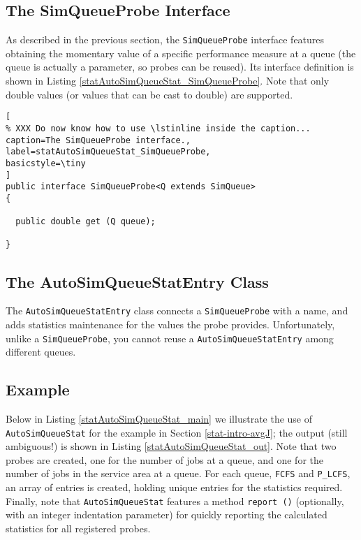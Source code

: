 \documentclass[12pt]{book}
\begin{document}
\subsection{The SimQueueProbe Interface}
\label{stat-autosimqueuestat-simqueueprobe}

As described in the previous section,
  the \lstinline-SimQueueProbe- interface
  features obtaining the momentary value of a specific performance measure
  at a queue (the queue is actually a parameter, so probes can be reused).
Its interface definition is shown in Listing \ref{statAutoSimQueueStat_SimQueueProbe}.
Note that only double values (or values that can be cast to double)
  are supported.

\begin{lstlisting}[
% XXX Do now know how to use \lstinline inside the caption...
caption=The SimQueueProbe interface.,
label=statAutoSimQueueStat_SimQueueProbe,
basicstyle=\tiny
]
public interface SimQueueProbe<Q extends SimQueue>
{
  
  public double get (Q queue);
  
}
\end{lstlisting}

\subsection{The AutoSimQueueStatEntry Class}
\label{stat-autosimqueuestat-autosimqueuestatentry}

The \lstinline|AutoSimQueueStatEntry| class connects a \lstinline|SimQueueProbe| with a name,
  and adds statistics maintenance for the values the probe provides.
Unfortunately, unlike a \lstinline|SimQueueProbe|,
  you cannot reuse a \lstinline|AutoSimQueueStatEntry| among different queues.

\subsection{Example}

Below in Listing \ref{statAutoSimQueueStat_main}
  we illustrate the use of \lstinline|AutoSimQueueStat|
  for the example in Section \ref{stat-intro-avgJ};
  the output (still ambiguous!) is shown in Listing \ref{statAutoSimQueueStat_out}.
Note that two probes are created, one for the number of jobs at a queue,
  and one for the number of jobs in the service area at a queue.
For each queue, \lstinline|FCFS| and \lstinline|P_LCFS|,
  an array of entries is created, holding
  unique entries for the statistics required.
Finally, note that \lstinline|AutoSimQueueStat| features a method \lstinline|report ()|
  (optionally, with an integer indentation parameter)
  for quickly reporting the calculated statistics for all registered probes.
\end{document}
